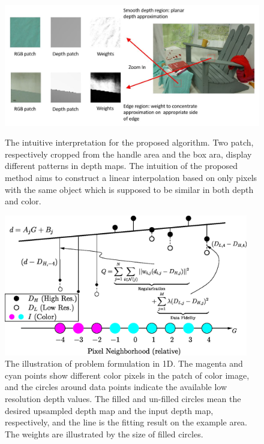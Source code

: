 \begin{figure}
\centering
\includegraphics[width=0.95\linewidth]{depth_interp/misc/zoomin.JPG}
\label{fig2:zoomin}
\caption{The intuitive interpretation for the proposed algorithm. Two patch, respectively cropped from the handle area and the box ara, display different patterns in depth maps. The intuition of the proposed method aims to construct a linear interpolation based on only pixels with the same object which is supposed to be similar in both depth and color.}
\end{figure}
\begin{figure}[htb]
\centering
\includegraphics[width = 0.95\textwidth]{depth_interp/ProbFormulation.eps}
\vfill
\caption{The illustration of problem formulation in 1D. The magenta and cyan points show different color pixels in the patch of color image, and the circles around data points indicate the available low resolution depth values. The filled and un-filled circles mean the desired upsampled depth map and the input depth map, respectively, and the line is the fitting result on the example area. The weights are illustrated by the size of filled circles.}
\label{fig2:outline}
\end{figure}

